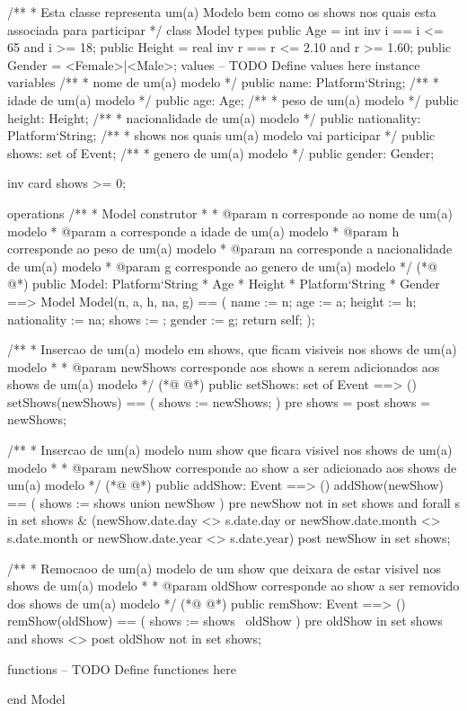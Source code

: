 \begin{vdmpp}[breaklines=true]
/**
* Esta classe representa um(a) Modelo bem como os shows nos quais esta associada para participar
*/
class Model
types
 public Age = int
  inv i ==  i <= 65 and  i >= 18;
 public Height = real 
  inv r == r <= 2.10 and r >= 1.60;
 public Gender = <Female>|<Male>;
values
-- TODO Define values here
instance variables
 /**
 * nome de um(a) modelo
 */ 
 public name:  Platform`String;
 /**
 * idade de um(a) modelo
 */
 public age: Age;
 /**
 * peso de um(a) modelo
 */
 public height: Height;
 /**
 * nacionalidade de um(a) modelo
 */ 
 public nationality: Platform`String;
 /**
 * shows nos quais um(a) modelo vai participar
 */
 public shows: set of Event;
 /**
 * genero de um(a) modelo
 */
 public gender: Gender;
 
 inv card shows >= 0;
 
operations
 /**
 * Model construtor
 * 
 * @param n corresponde ao nome de um(a) modelo
 * @param a corresponde a  idade de um(a) modelo
 * @param h corresponde ao peso de um(a) modelo
 * @param na corresponde a  nacionalidade de um(a) modelo
 * @param g corresponde ao genero de um(a) modelo
 */
(*@
\label{Model:51}
@*)
 public Model: Platform`String * Age * Height * Platform`String * Gender ==> Model 
 Model(n, a, h, na, g) == 
 (
  name := n;
  age := a;
  height := h;
  nationality := na;
  shows := {};
  gender := g;
  return self;
 );
 
 /**
 * Insercao de um(a) modelo em shows, que ficam visiveis nos shows de um(a) modelo
 * 
 * @param newShows corresponde aos shows a serem adicionados aos shows de um(a) modelo
 */
(*@
\label{setShows:68}
@*)
 public setShows: set of Event ==> ()
  setShows(newShows) == (
   shows := newShows;
  )
 pre shows = {}
 post shows = newShows;
 
 /**
 * Insercao de um(a) modelo num show que ficara visivel nos shows de um(a) modelo
 * 
 * @param newShow corresponde ao show a ser adicionado aos shows de um(a) modelo
 */
(*@
\label{addShow:80}
@*)
 public addShow: Event ==> ()
  addShow(newShow) == (
     shows := shows union {newShow}
 )
 pre newShow not in set shows 
  and forall s in set shows & (newShow.date.day <> s.date.day or
                 newShow.date.month <> s.date.month or
                  newShow.date.year <> s.date.year)
 post newShow in set shows;
 
 /**
 * Remocaoo de um(a) modelo de um show que deixara de estar visivel nos shows de um(a) modelo
 * 
 * @param oldShow corresponde ao show a ser removido dos shows de um(a) modelo
 */
(*@
\label{remShow:95}
@*)
 public remShow: Event ==> ()
  remShow(oldShow) == (
   shows := shows \ {oldShow}
  )
  pre oldShow in set shows
  and shows <> {}
  post oldShow not in set shows;
  
functions
-- TODO Define functiones here

end Model
\end{vdmpp}
